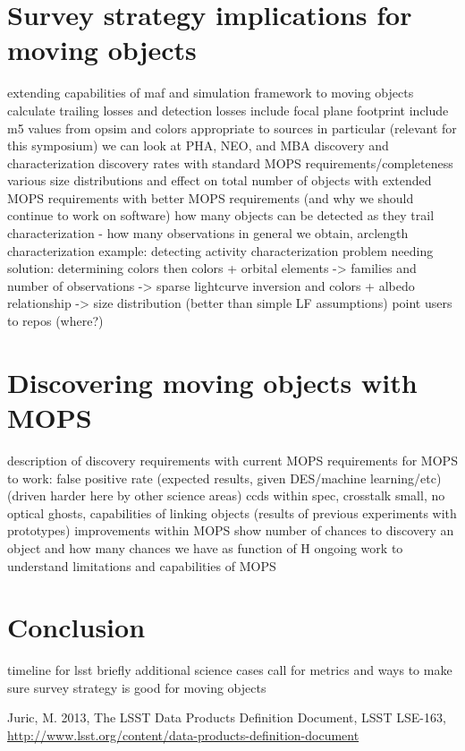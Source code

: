 \documentclass{iau}
\begin{document}
\section{Survey strategy implications for moving objects}
extending capabilities of maf and simulation framework to moving
objects
calculate trailing losses and detection losses
include focal plane footprint
include m5 values from opsim and colors appropriate to sources
in particular (relevant for this symposium) we can look at PHA, NEO,
and MBA discovery and characterization
discovery rates with standard MOPS requirements/completeness
 various size distributions and effect on total number of objects
with extended MOPS requirements
with better MOPS requirements (and why we should continue to work on software)
how many objects can be detected as they trail
characterization - how many observations in general we obtain,
arclength
characterization example: detecting activity
characterization problem needing solution: determining colors
then colors + orbital elements -> families
and number of observations -> sparse lightcurve inversion
and colors + albedo relationship -> size distribution (better than
simple LF assumptions)
point users to repos (where?)

\section{Discovering moving objects with MOPS}
description of discovery requirements with current MOPS
requirements for MOPS to work:
 false positive rate (expected results, given DES/machine
 learning/etc) (driven harder here by other science areas)
   ccds within spec, crosstalk small, no optical ghosts, 
 capabilities of linking objects (results of previous experiments with
 prototypes)  improvements within MOPS
show number of chances to discovery an object and how many chances we
have as function of H 
ongoing work to understand limitations and capabilities of MOPS

\section{Conclusion}
timeline for lsst
briefly additional science cases
call for metrics and ways to make sure survey strategy is good for
moving objects



\begin{thebibliography}{}

{Juric, M.} 2013, The LSST Data Products Definition Document, LSST LSE-163,
\url{http://www.lsst.org/content/data-products-definition-document}

\end{thebibliography}

\end{document}
